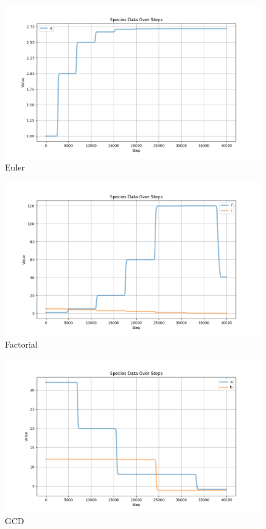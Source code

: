 \begin{figure}[H]
    \centering
    \includegraphics[width=\textwidth]{report/figures/SimulatorPlots/eulerSim.png}
    \caption{Euler}
\end{figure}

\begin{figure}[H]
    \centering
    \includegraphics[width=\textwidth]{report/figures/SimulatorPlots/factorialSim.png}
    \caption{Factorial}
\end{figure}

\begin{figure}[H]
    \centering
    \includegraphics[width=\textwidth]{report/figures/SimulatorPlots/gcdSim.png}
    \caption{GCD}
\end{figure}

